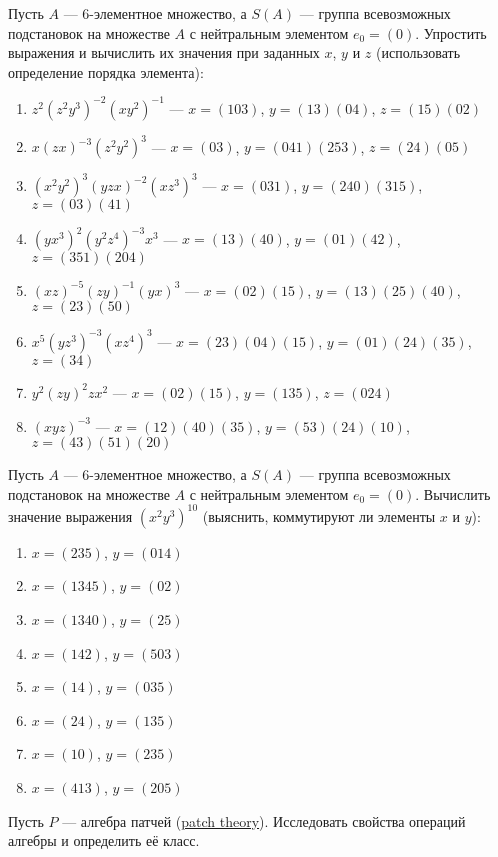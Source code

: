 \begin{task}
    Пусть $A$ --- 6-элементное множество, а $S(A)$ --- группа всевозможных подстановок на множестве $A$ с нейтральным элементом $e_0=(0)$. Упростить выражения и вычислить их значения при заданных $x$, $y$ и $z$ (использовать определение порядка элемента):
    \begin{enumerate}
        \item $z^2 (z^2 y^3)^{-2} (x y^2)^{-1}$ --- $x=(103)$, $y=(13)(04)$, $z=(15)(02)$
        
        \item $x (z x)^{-3} (z^2 y^2)^3$ --- $x=(03)$, $y=(041)(253)$, $z=(24)(05)$
        
        \item $(x^2 y^2)^3 (y z x)^{-2} (x z^3)^3$ --- $x=(031)$, $y=(240)(315)$, $z=(03)(41)$
        
        \item $(y x^3)^2 (y^2 z^4)^{-3} x^3$ --- $x=(13)(40)$, $y=(01)(42)$, $z=(351)(204)$
        
        \item $(x z)^{-5} (z y)^{-1} (y x)^{3}$ --- $x=(02)(15)$, $y=(13)(25)(40)$, $z=(23)(50)$
        
        \item $x^5 (y z^3)^{-3} (x z^4)^3$ --- $x=(23)(04)(15)$, $y=(01)(24)(35)$, $z=(34)$
        
        \item $y^2 (z y)^2 z x^2$ --- $x=(02)(15)$, $y=(135)$, $z=(024)$
        
        \item $(xyz)^{-3}$ --- $x=(12)(40)(35)$, $y=(53)(24)(10)$, $z=(43)(51)(20)$
    \end{enumerate}
\end{task}

\begin{task}
    Пусть $A$ --- 6-элементное множество, а $S(A)$ --- группа всевозможных подстановок на множестве $A$ с нейтральным элементом $e_0=(0)$. Вычислить значение выражения $(x^2 y^3)^{10}$ (выяснить, коммутируют ли элементы $x$ и $y$):
    \begin{enumerate}
        \item $x=(235)$, $y=(014)$
        \item $x=(1345)$, $y=(02)$
        \item $x=(1340)$, $y=(25)$
        \item $x=(142)$, $y=(503)$
        \item $x=(14)$, $y=(035)$
        \item $x=(24)$, $y=(135)$
        \item $x=(10)$, $y=(235)$
        \item $x=(413)$, $y=(205)$
    \end{enumerate}
\end{task}

\begin{task}
    Пусть $P$ --- алгебра патчей (\href{https://en.wikibooks.org/wiki/Understanding_Darcs/Patch_theory}{patch theory}). Исследовать свойства операций алгебры и определить её класс.
\end{task}
